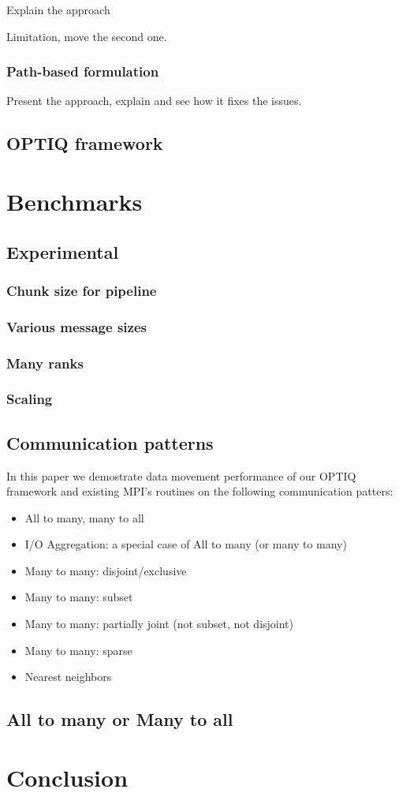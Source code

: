 \documentclass[letter]{article}
\begin{document}
Explain the approach

Limitation, move the second one.

\subsubsection{Path-based formulation}
Present the approach, explain and see how it fixes the issues.

\subsection{OPTIQ framework}

\section{Benchmarks}

\subsection{Experimental }
\subsubsection{Chunk size for pipeline}
\subsubsection{Various message sizes}
\subsubsection{Many ranks}
\subsubsection{Scaling}

\subsection{Communication patterns}
In this paper we demostrate data movement performance of our OPTIQ framework and existing MPI's routines on the following communication patters:

\begin{itemize}
\item All to many, many to all
\item I/O Aggregation: a special case of All to many (or many to many)
\item Many to many: disjoint/exclusive
\item Many to many: subset
\item Many to many: partially joint (not subset, not disjoint)
\item Many to many: sparse
\item Nearest neighbors
\end{itemize}

\subsection{All to many or Many to all}

\section{Conclusion}
\end{document}
